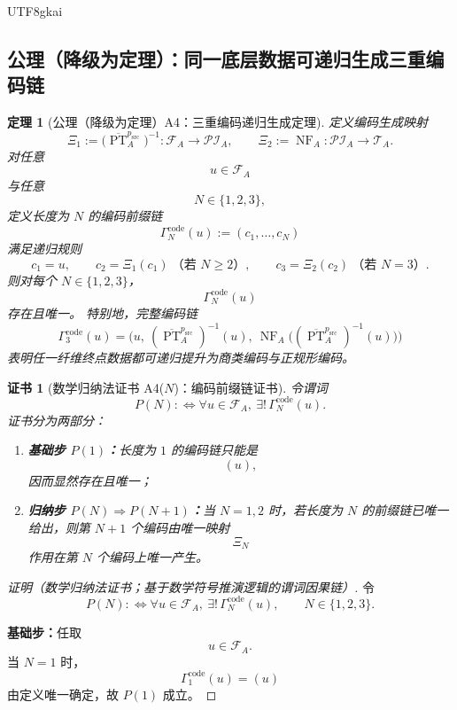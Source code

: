 \documentclass[12pt]{article}
\newtheorem{theorem}{定理}[section]
\newtheorem{Certificate}{证书}[section]
\newcommand{\PT}{\operatorname{PT}}
\newcommand{\NF}{\operatorname{NF}}
\begin{document}
\begin{CJK*}{UTF8}{gkai}
\subsection{公理（降级为定理）：同一底层数据可递归生成三重编码链}
\label{subsec:tex36-code-chain}

\begin{theorem}[公理（降级为定理）A4：三重编码递归生成定理]
\label{thm:tex36-a4}
定义编码生成映射
\[
  \Xi_1
  :=
  \bigl(\overline{\PT}_A^{p_{\mathrm{src}}}\bigr)^{-1}
  :
  \mathcal F_A\to \mathcal{PI}_A,
  \qquad
  \Xi_2
  :=
  \NF_A
  :
  \mathcal{PI}_A\to \mathcal T_A.
\]
对任意
\[
  u\in \mathcal F_A
\]
与任意
\[
  N\in\{1,2,3\},
\]
定义长度为 $N$ 的编码前缀链
\[
  \Gamma_N^{\mathrm{code}}(u)
  :=
  (c_1,\ldots,c_N)
\]
满足递归规则
\[
  c_1=u,\qquad
  c_2=\Xi_1(c_1)\ \text{（若 }N\ge 2\text{）},\qquad
  c_3=\Xi_2(c_2)\ \text{（若 }N=3\text{）}.
\]
则对每个 $N\in\{1,2,3\}$，
\[
  \Gamma_N^{\mathrm{code}}(u)
\]
存在且唯一。
特别地，完整编码链
\[
  \Gamma_3^{\mathrm{code}}(u)
  =
  \bigl(
    u,\
    (\overline{\PT}_A^{p_{\mathrm{src}}})^{-1}(u),\
    \NF_A\bigl((\overline{\PT}_A^{p_{\mathrm{src}}})^{-1}(u)\bigr)
  \bigr)
\]
表明任一纤维终点数据都可递归提升为商类编码与正规形编码。
\end{theorem}

\begin{Certificate}[数学归纳法证书 A4($N$)：编码前缀链证书]
\label{cert:tex36-a4}
令谓词
\[
  P(N)
  :
  \Longleftrightarrow
  \forall u\in\mathcal F_A,\ \exists!\,\Gamma_N^{\mathrm{code}}(u).
\]
证书分为两部分：
\begin{enumerate}
  \item \textbf{基础步 $P(1)$：}长度为 $1$ 的编码链只能是
  \[
    (u),
  \]
  因而显然存在且唯一；
  \item \textbf{归纳步 $P(N)\Rightarrow P(N+1)$：}当 $N=1,2$ 时，若长度为 $N$ 的前缀链已唯一给出，则第 $N+1$ 个编码由唯一映射
  \[
    \Xi_N
  \]
  作用在第 $N$ 个编码上唯一产生。
\end{enumerate}
\end{Certificate}

\begin{proof}[证明（数学归纳法证书；基于数学符号推演逻辑的谓词因果链）]
令
\[
  P(N)
  :
  \Longleftrightarrow
  \forall u\in\mathcal F_A,\ \exists!\,\Gamma_N^{\mathrm{code}}(u),
  \qquad N\in\{1,2,3\}.
\]

\textbf{基础步：}任取
\[
  u\in \mathcal F_A.
\]
当 $N=1$ 时，
\[
  \Gamma_1^{\mathrm{code}}(u)=(u)
\]
由定义唯一确定，故 $P(1)$ 成立。


\end{proof}
\end{CJK*}
\end{document}
